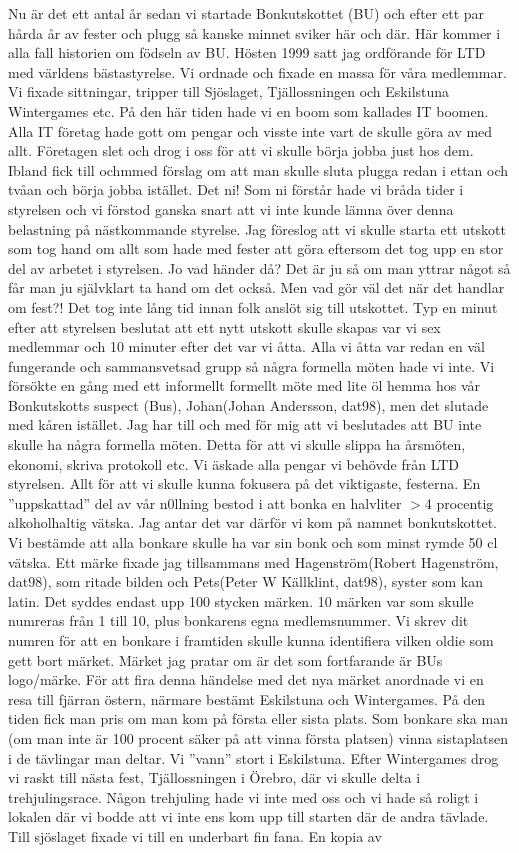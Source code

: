Nu är det ett antal år sedan vi startade Bonkutskottet (BU) och efter ett par hårda år av fester och plugg så kanske minnet sviker här och där. Här kommer i alla fall historien om födseln av BU. Hösten 1999 satt jag ordförande för LTD med världens bästastyrelse. Vi ordnade och fixade en massa för våra medlemmar. Vi fixade sittningar, tripper till Sjöslaget, Tjällossningen och Eskilstuna Wintergames etc. På den här tiden hade vi en boom som kallades IT boomen. Alla IT företag hade gott om pengar och visste inte vart de skulle göra av med allt. Företagen slet och drog i oss för att vi skulle börja jobba just hos dem. Ibland fick till ochmmed förslag om att man skulle sluta plugga redan i ettan och tvåan och börja jobba istället. Det ni! Som ni förstår hade vi bråda tider i styrelsen och vi förstod ganska snart att vi inte kunde lämna över denna belastning på nästkommande styrelse. Jag föreslog att vi skulle starta ett utskott som tog hand om allt som hade med fester att göra eftersom det tog upp en stor del av arbetet i styrelsen. Jo vad händer då? Det är ju så om man yttrar något så får man ju självklart ta hand om det också. Men vad gör väl det när det handlar om fest?! Det tog inte lång tid innan folk anslöt sig till utskottet. Typ en minut efter att styrelsen beslutat att ett nytt utskott skulle skapas var vi sex medlemmar och 10 minuter efter det var vi åtta. Alla vi åtta var redan en väl fungerande och sammansvetsad grupp så några formella möten hade vi inte. Vi försökte en gång med ett informellt formellt möte med lite öl hemma hos vår Bonkutskotts suspect (Bus), Johan(Johan Andersson, dat98), men det slutade med kåren istället. Jag har till och med för mig att vi beslutades att BU inte skulle ha några formella möten. Detta för att vi skulle slippa ha årsmöten, ekonomi, skriva protokoll etc. Vi äskade alla pengar vi behövde från LTD styrelsen. Allt för att vi skulle kunna fokusera på det viktigaste, festerna. En ”uppskattad” del av vår n0llning bestod i att bonka en halvliter \(>\)4 procentig alkoholhaltig vätska. Jag antar det var därför vi kom på namnet bonkutskottet. Vi bestämde att alla bonkare skulle ha var sin bonk och som minst rymde 50 cl vätska. Ett märke fixade jag tillsammans med Hagenström(Robert Hagenström, dat98), som ritade bilden och Pets(Peter W Källklint, dat98), syster som kan latin. Det syddes endast upp 100 stycken märken. 10 märken var som skulle numreras från 1 till 10, plus bonkarens egna medlemsnummer. Vi skrev dit numren för att en bonkare i framtiden skulle kunna identifiera vilken oldie som gett bort märket. Märket jag pratar om är det som fortfarande är BUs logo/märke. För att fira denna händelse med det nya märket anordnade vi en resa till fjärran östern, närmare bestämt Eskilstuna och Wintergames. På den tiden fick man pris om man kom på första eller sista plats. Som bonkare ska man (om man inte är 100 procent säker på att vinna första platsen) vinna sistaplatsen i de tävlingar man deltar. Vi ”vann” stort i Eskilstuna. Efter Wintergames drog vi raskt till nästa fest, Tjällossningen i Örebro, där vi skulle delta i trehjulingsrace. Någon trehjuling hade vi inte med oss och vi hade så roligt i lokalen där vi bodde att vi inte ens kom upp till starten där de andra tävlade. Till sjöslaget fixade vi till en underbart fin fana. En kopia av 